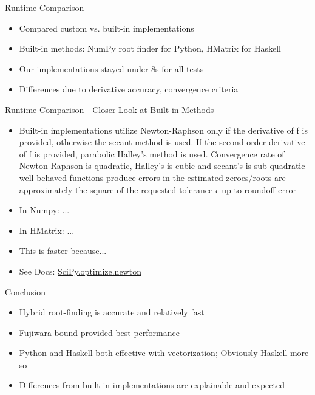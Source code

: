 \documentclass{beamer}
\begin{document}
\begin{frame}{Runtime Comparison}
\begin{itemize}
    \item Compared custom vs. built-in implementations
    \item Built-in methods: NumPy root finder for Python, HMatrix for Haskell
    \item Our implementations stayed under 8s for all tests
    \item Differences due to derivative accuracy, convergence criteria
\end{itemize}
\end{frame}

\begin{frame}{Runtime Comparison - Closer Look at Built-in Methods}
\begin{itemize}
    \item Built-in implementations utilize Newton-Raphson only if the derivative of f is provided, otherwise the secant method is used. If the second order derivative of f is provided, parabolic Halley's method is used.
    \subitem Convergence rate of Newton-Raphson is quadratic, Halley's is cubic and secant's is sub-quadratic - well behaved functions produce errors in the estimated zeroes/roots are approximately the square of the requested tolerance $\epsilon $ up to roundoff error
    \item In Numpy: ...
    \item In HMatrix: ...
    \item This is faster because...
    \item See Docs: \href{https://docs.scipy.org/doc/scipy-0.14.0/reference/generated/scipy.optimize.newton.html}{SciPy.optimize.newton}
\end{itemize}
\end{frame}

\begin{frame}{Conclusion}
\begin{itemize}
    \item Hybrid root-finding is accurate and relatively fast
    \item Fujiwara bound provided best performance
    \item Python and Haskell both effective with vectorization; Obviously Haskell more so
    \item Differences from built-in implementations are explainable and expected
\end{itemize}
\end{frame}
\end{document}
